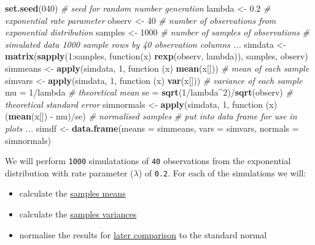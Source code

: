 \documentclass[legalpaper]{article}
\newenvironment{Shaded}{\begin{snugshade}}{\end{snugshade}}
\newcommand{\KeywordTok}[1]{\textcolor[rgb]{0.13,0.29,0.53}{\textbf{{#1}}}}
\newcommand{\DataTypeTok}[1]{\textcolor[rgb]{0.13,0.29,0.53}{{#1}}}
\newcommand{\DecValTok}[1]{\textcolor[rgb]{0.00,0.00,0.81}{{#1}}}
\newcommand{\FloatTok}[1]{\textcolor[rgb]{0.00,0.00,0.81}{{#1}}}
\newcommand{\StringTok}[1]{\textcolor[rgb]{0.31,0.60,0.02}{{#1}}}
\newcommand{\CommentTok}[1]{\textcolor[rgb]{0.56,0.35,0.01}{\textit{{#1}}}}
\newcommand{\NormalTok}[1]{{#1}}
\begin{document}
\begin{Shaded}
\begin{Highlighting}[]
\KeywordTok{set.seed}\NormalTok{(}\DecValTok{040}\NormalTok{)       }\CommentTok{# seed for random number generation}
\NormalTok{lambda <-}\StringTok{ }\FloatTok{0.2}       \CommentTok{# exponential rate parameter}
\NormalTok{observ <-}\StringTok{ }\DecValTok{40}        \CommentTok{# number of observations from exponential distribution}
\NormalTok{samples <-}\StringTok{ }\DecValTok{1000}     \CommentTok{# number of samples of observations}
\CommentTok{# simulated data 1000 sample rows by 40 observation columns ...}
\NormalTok{simdata <-}\StringTok{ }\KeywordTok{matrix}\NormalTok{(}\KeywordTok{sapply}\NormalTok{(}\DecValTok{1}\NormalTok{:samples, function(x) }\KeywordTok{rexp}\NormalTok{(observ, lambda)), samples, observ)}
\NormalTok{simmeans <-}\StringTok{ }\KeywordTok{apply}\NormalTok{(simdata, }\DecValTok{1}\NormalTok{, function (x) }\KeywordTok{mean}\NormalTok{(x[]))   }\CommentTok{# mean of each sample}
\NormalTok{simvars <-}\StringTok{ }\KeywordTok{apply}\NormalTok{(simdata, }\DecValTok{1}\NormalTok{, function (x) }\KeywordTok{var}\NormalTok{(x[]))     }\CommentTok{# variance of each sample}
\NormalTok{mu =}\StringTok{ }\DecValTok{1}\NormalTok{/lambda                                           }\CommentTok{# theoretical mean}
\NormalTok{se =}\StringTok{ }\KeywordTok{sqrt}\NormalTok{(}\DecValTok{1}\NormalTok{/lambda^}\DecValTok{2}\NormalTok{)/}\KeywordTok{sqrt}\NormalTok{(observ)                      }\CommentTok{# theoretical standard error}
\NormalTok{simnormals <-}\StringTok{ }\KeywordTok{apply}\NormalTok{(simdata, }\DecValTok{1}\NormalTok{, function (x) (}\KeywordTok{mean}\NormalTok{(x[]) -}\StringTok{ }\NormalTok{mu)/se) }\CommentTok{# normalised samples}
\CommentTok{# put into data frame for use in plots ...}
\NormalTok{simdf <-}\StringTok{ }\KeywordTok{data.frame}\NormalTok{(}\DataTypeTok{means =} \NormalTok{simmeans, }\DataTypeTok{vars =} \NormalTok{simvars, }\DataTypeTok{normals =} \NormalTok{simnormals)}
\end{Highlighting}
\end{Shaded}

We will perform \texttt{1000} simulatations of \texttt{40} observations
from the exponential distribution with rate parameter (\(\lambda\)) of
\texttt{0.2}. For each of the simulations we will:

\begin{itemize}
\itemsep1pt\parskip0pt
\item
  calculate the \hyperref[sample-mean-versus-theoretical-mean]{samples
  means}
\item
  calculate the
  \hyperref[sample-variance-versus-theoretical-variance]{samples
  variances}
\item
  normalise the results for
  \hyperref[distribution-is-approximately-normal]{later comparison} to
  the standard normal
\end{itemize}
\end{document}
